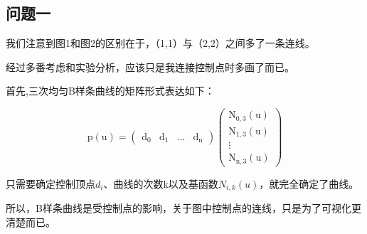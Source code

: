 \documentclass[12pt,a4paper]{article}
\begin{document}
\subsection{问题一}
我们注意到图1和图2的区别在于，（1,1）与（2,2）之间多了一条连线。

经过多番考虑和实验分析，应该只是我连接控制点时多画了而已。

首先,三次均匀B样条曲线的矩阵形式表达如下：

$$
\mathrm{p}(\mathrm{u})=\left(\begin{array}{cccc}{\mathrm{d}_{0}} & {\mathrm{d}_{1}} & {\ldots} & {\mathrm{d}_{\mathrm{n}}}\end{array}\right)\left(\begin{array}{c}{\mathrm{N}_{0, \mathrm{3}}(\mathrm{u})} \\ {\mathrm{N}_{1, \mathrm{3}}(\mathrm{u})} \\ {\vdots} \\ {\mathrm{N}_{\mathrm{n}, \mathrm{3}}(\mathrm{u})}\end{array}\right)
$$

只需要确定控制顶点$d_i$、曲线的次数k以及基函数$N_{i,k}(u)$，就完全确定了曲线。

所以，B样条曲线是受控制点的影响，关于图中控制点的连线，只是为了可视化更清楚而已。
\end{document}
